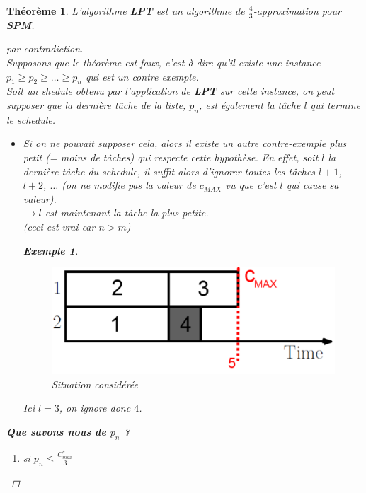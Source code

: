 \documentclass{article}
\newcommand{\titre}[1]{\textcolor{title}{#1}}
\newtheorem{exemple}{Exemple}[section]
\newtheorem{thm}{Th\'eor\`eme}[section]
\newtheorem{proof}{Preuve}[section]
\begin{document}
\begin{sffamily}
\begin{thm} L'algorithme \textbf{LPT} est un algorithme de $\frac 4 3$-approximation pour \textbf{\titre{SPM}}.
\begin{proof}[par contradiction]$ $\\
Supposons que le théorème est faux, c'est-à-dire qu'il existe une instance $p_1\geq p_2\geq \ldots \geq p_n$ qui est un contre exemple. \\
Soit un shedule obtenu par l'application de \textbf{LPT} sur cette instance, on peut supposer que la dernière tâche de la liste, $p_n$, est 
également la tâche $l$ qui termine le schedule.
\begin{itemize}
\item[$\hookrightarrow$] Si on ne pouvait supposer cela, alors il existe un autre contre-exemple plus petit (= moins de tâches) qui 
respecte cette hypothèse. En effet, soit $l$ la dernière tâche du schedule, il suffit alors d'ignorer toutes les tâches $l+1$, $l+2$, 
$\ldots$ (on ne modifie pas la valeur de $c_{MAX}$ vu que c'est $l$ qui cause sa valeur).\\
	 $\rightarrow l$ est maintenant la tâche la plus petite. \\
	 \textit{(ceci est vrai car $n>m$)}
	 \begin{exemple}$ $
\begin{figure}[h!]
    \begin{center}
    \includegraphics[scale=0.3]{spm8.pdf}
    \caption{Situation considérée}
    \end{center}	
\end{figure}
	Ici $l=3$, on ignore donc $4$.
	 \end{exemple}
\end{itemize}
\textbf{Que savons nous de $p_n$ ?}
\begin{enumerate}
\item[a)] si $p_n \leq \frac{C^*_{max}}{3}$


\end{enumerate}
\end{proof}
\end{thm}
\end{sffamily}
\end{document}

